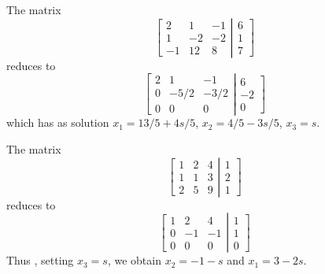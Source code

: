 \vspace{2mm}
The matrix 
\[
\left[
\begin{array}{ccc}
2&1&-1 \\
1&-2&-2 \\
-1&12&8
\end{array} \right| \left.
\begin{array}{c}
6 \\ 1 \\ 7
\end{array}
\right]
\]
reduces to
\[
\left[
\begin{array}{ccc}
2&1&-1 \\
0&-5/2&-3/2 \\
0&0&0
\end{array} \right| \left.
\begin{array}{c}
6 \\ -2 \\ 0
\end{array}
\right]
\]
which has as solution
$x_1=13/5+4s/5$, $x_2=4/5-3s/5$, $x_3=s$.

\vspace{2mm}
The matrix 
\[
\left[
\begin{array}{ccc}
1&2&4 \\
1&1&3 \\
2&5&9
\end{array} \right| \left.
\begin{array}{c}
1 \\ 2 \\ 1
\end{array}
\right]
\]
reduces to
\[
\left[
\begin{array}{ccc}
1&2&4 \\
0&-1&-1 \\
0&0&0
\end{array} \right| \left.
\begin{array}{c}
1 \\ 1 \\ 0
\end{array}
\right]
\]
Thus , setting $x_3=s$, we obtain $x_2 = -1-s$ and $x_1=3-2s$.

